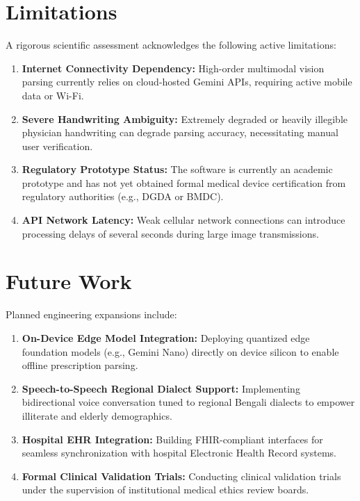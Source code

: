 \documentclass[12pt,a4paper,oneside]{report}
\begin{document}
\chapter{Limitations}

A rigorous scientific assessment acknowledges the following active limitations:

\begin{enumerate}
    \item \textbf{Internet Connectivity Dependency:} High-order multimodal vision parsing currently relies on cloud-hosted Gemini APIs, requiring active mobile data or Wi-Fi.
    \item \textbf{Severe Handwriting Ambiguity:} Extremely degraded or heavily illegible physician handwriting can degrade parsing accuracy, necessitating manual user verification.
    \item \textbf{Regulatory Prototype Status:} The software is currently an academic prototype and has not yet obtained formal medical device certification from regulatory authorities (e.g., DGDA or BMDC).
    \item \textbf{API Network Latency:} Weak cellular network connections can introduce processing delays of several seconds during large image transmissions.
\end{enumerate}

\chapter{Future Work}

Planned engineering expansions include:

\begin{enumerate}
    \item \textbf{On-Device Edge Model Integration:} Deploying quantized edge foundation models (e.g., Gemini Nano) directly on device silicon to enable offline prescription parsing.
    \item \textbf{Speech-to-Speech Regional Dialect Support:} Implementing bidirectional voice conversation tuned to regional Bengali dialects to empower illiterate and elderly demographics.
    \item \textbf{Hospital EHR Integration:} Building FHIR-compliant interfaces for seamless synchronization with hospital Electronic Health Record systems.
    \item \textbf{Formal Clinical Validation Trials:} Conducting clinical validation trials under the supervision of institutional medical ethics review boards.
\end{enumerate}
\end{document}
